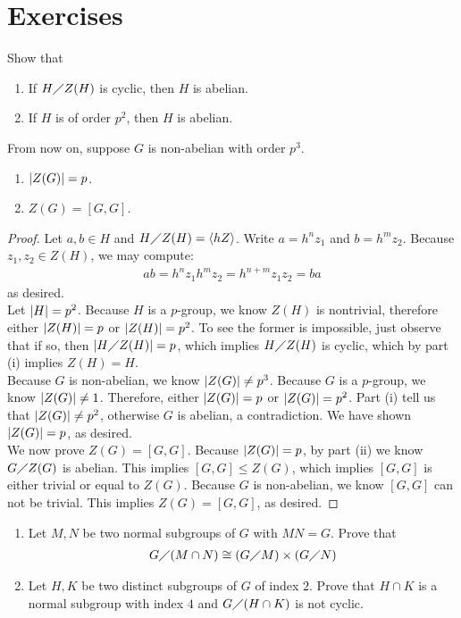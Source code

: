 \documentclass{report}
\begin{document}
\section{Exercises}
\begin{question}{}{}
Show that 
\begin{enumerate}[label=(\roman*)]
  \item If $H \diagup Z(H)$ is cyclic, then $H$ is abelian.  
  \item If $H$ is of order  $p^2$, then  $H$ is abelian.   
\end{enumerate}
From now on, suppose $G$ is non-abelian with order  $p^3$. 
\begin{enumerate}[label=(\roman*), start=3]
  \item $\left|Z(G)\right|=p$. 
  \item $Z(G)=[G,G]$.  
\end{enumerate}
\end{question}
\begin{proof}
Let $a,b\in H$ and $H \diagup Z(H)= \langle hZ\rangle $. Write $a=h^nz_1$ and $b=h^mz_2$. Because  $z_1,z_2 \in Z(H)$, we may compute: 
\begin{align*}
ab=h^nz_1h^mz_2=h^{n+m}z_1z_2=ba
\end{align*}
as desired. \\

Let $\left|H\right|=p^2$. Because $H$ is a  $p$-group, we know $Z(H)$ is nontrivial, therefore either $\left|Z(H)\right|=p$ or $\left|Z(H)\right|=p^2$. To see the former is impossible, just observe that if so, then $\left|H\diagup Z(H)\right|=p$, which implies $H\diagup Z(H)$ is cyclic, which by part (i) implies $Z(H)=H$. \\

Because $G$ is non-abelian, we know  $\left|Z(G)\right|\neq p^3$. Because $G$ is a  $p$-group, we know  $\left|Z(G)\right|\neq 1$. Therefore, either $\left|Z(G)\right|=p$ or $\left|Z(G)\right|=p^2$. Part (i) tell us that $\left|Z(G)\right|\neq p^2$, otherwise $G$ is abelian, a contradiction. We have shown  $\left|Z(G)\right|=p$, as desired. \\

We now prove $Z(G)=[G,G]$. Because $\left|Z(G)\right|=p$, by part (ii) we know $G\diagup Z(G)$ is abelian. This implies $[G,G] \leq  Z(G)$, which implies $[G,G]$ is either trivial or equal to $Z(G)$. Because $G$ is non-abelian, we know  $[G,G]$ can not be trivial. This implies $Z(G)=[G,G]$, as desired.
\end{proof}
\begin{question}{}{}
\begin{enumerate}[label=(\roman*)]
  \item Let $M,N$ be two normal subgroups of  $G$ with  $MN=G$. Prove that 
\begin{align*}
    G\diagup (M\cap N) \cong  (G\diagup M) \times (G\diagup N)
\end{align*} 
\item Let $H,K$ be two distinct subgroups of  $G$ of index  $2$. Prove that  $H\cap K$ is a normal subgroup with index $4$ and  $G \diagup (H\cap K)$ is not cyclic.  
\end{enumerate}
\end{question}
\end{document}
